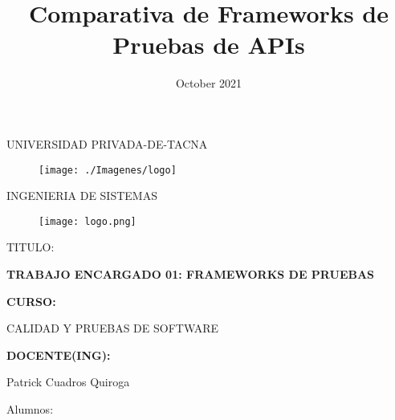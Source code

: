 \documentclass{article}
\title{Comparativa de Frameworks de Pruebas de APIs}
\date{October 2021}
\begin{document}
\begin{titlepage}
\begin{center}
\large{UNIVERSIDAD PRIVADA-DE-TACNA}\\
\vspace*{-0.025in}
\begin{figure}[htb]
\begin{center}
\texttt{[image: ./Imagenes/logo]}
\end{center}
\end{figure}
\vspace*{0.15in}
INGENIERIA DE SISTEMAS  \\
\begin{figure}[H]
\centering
\texttt{[image: logo.png]}

\end{figure}
\vspace*{0.5in}
\begin{large}
TITULO:\\
\end{large}

\vspace*{0.1in}
\begin{Large}
\textbf{TRABAJO ENCARGADO 01: FRAMEWORKS DE PRUEBAS} \\
\end{Large}

\vspace*{0.3in}
\begin{Large}
\textbf{CURSO:} \\
\end{Large}

\vspace*{0.1in}
\begin{large}
CALIDAD Y PRUEBAS DE SOFTWARE\\
\end{large}

\vspace*{0.3in}
\begin{Large}
\textbf{DOCENTE(ING):} \\
\end{Large}

\vspace*{0.1in}
\begin{large}
 Patrick Cuadros Quiroga\\
\end{large}

\vspace*{0.2in}
\vspace*{0.1in}
\begin{large}
Alumnos: \\
\begin{flushleft}



\end{flushleft}
\end{large}
\end{center}
\end{titlepage}
\end{document}
